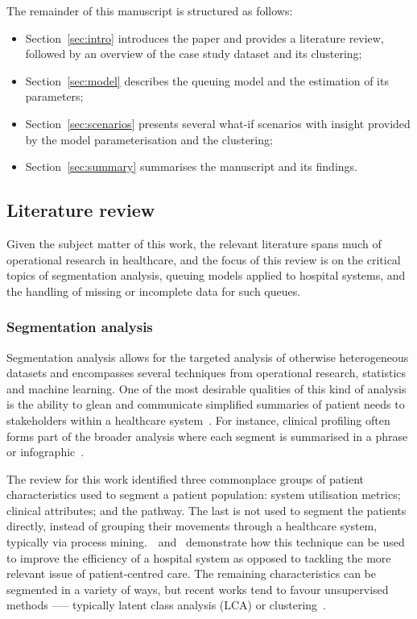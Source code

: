 \documentclass[]{interact}
\theoremstyle{plain}%
\theoremstyle{definition}
\theoremstyle{remark}
\begin{document}
The remainder of this manuscript is structured as follows:

\begin{itemize}
    \item Section~\ref{sec:intro} introduces the paper and provides a literature
        review, followed by an overview of the case study dataset and its
        clustering;
    \item Section~\ref{sec:model} describes the queuing model and the estimation
        of its parameters;
    \item Section~\ref{sec:scenarios} presents several what-if scenarios with
        insight provided by the model parameterisation and the clustering;
    \item Section~\ref{sec:summary} summarises the manuscript and its findings.
\end{itemize}


\subsection{Literature review}\label{subsec:review}

Given the subject matter of this work, the relevant literature spans much of
operational research in healthcare, and the focus of this review is on the
critical topics of segmentation analysis, queuing models applied to hospital
systems, and the handling of missing or incomplete data for such queues.

\subsubsection{Segmentation analysis}

Segmentation analysis allows for the targeted analysis of otherwise
heterogeneous datasets and encompasses several techniques from operational
research, statistics and machine learning. One of the most desirable qualities
of this kind of analysis is the ability to glean and communicate simplified
summaries of patient needs to stakeholders within a healthcare
system~\citep{Vuik2016b, Yoon2020}. For instance, clinical profiling often forms
part of the broader analysis where each segment is summarised in a phrase or
infographic~\citep{Vuik2016a,Yan2019}.

The review for this work identified three commonplace groups of patient
characteristics used to segment a patient population: system utilisation
metrics; clinical attributes; and the pathway. The last is not used to segment
the patients directly, instead of grouping their movements through a healthcare
system, typically via process mining.~\cite{Arnolds2018}~and~\cite{Delias2015}
demonstrate how this technique can be used to improve the efficiency of a
hospital system as opposed to tackling the more relevant issue of
patient-centred care. The remaining characteristics can be segmented in a
variety of ways, but recent works tend to favour unsupervised methods —--
typically latent class analysis (LCA) or clustering~\citep{Yan2018}.
\end{document}
